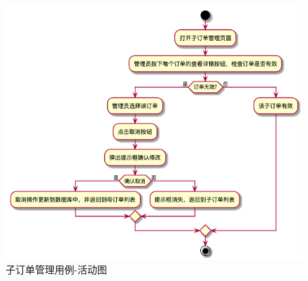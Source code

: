 \begin{figure}[htp]
    \centering
    \includegraphics[width=16cm]{report/figure/usecase_v2/5_uc_admin_manage_subOrder.png}
    \caption{子订单管理用例-活动图}
    \label{fig:5_uc_admin_manage_subOrder}
\end{figure}


